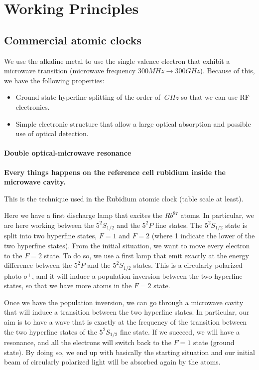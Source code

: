 \section{Working Principles}
\label{sec:working_principles}

\subsection{Commercial atomic clocks}
\label{sub:commercial_atomic_clocks}

We use the alkaline metal to use the single valence electron that exhibit a microwave transition (microwave frequency $300MHz \rightarrow 300GHz$).
Because of this, we have the following properties:

\begin{itemize}
    \item Ground state hyperfine splitting of the order of $~GHz$ so that we can use RF electronics.
    \item Simple electronic structure that allow a large optical absorption and possible use of optical detection.
\end{itemize}

\paragraph{Double optical-microwave resonance}

\textbf{Every things happens on the reference cell rubidium inside the microwave cavity.}

This is the technique used in the Rubidium atomic clock (table scale at least).

Here we have a first discharge lamp that excites the $Rb^{87}$ atoms.
In particular, we are here working between the $5^2S_{1/2}$ and the $5^2P$ fine states.
The $5^2S_{1/2}$ state is split into two hyperfine states, $F=1$ and $F=2$ (where 1 indicate the lower of the two hyperfine states).
From the initial situation, we want to move every electron to the $F=2$ state.
To do so, we use a first lamp that emit exactly at the energy difference between the $5^2P$ and the $5^2S_{1/2}$ states.
This is a circularly polarized photo $\sigma^+$, and it will induce a population inversion between the two hyperfine states, so that we have more atoms in the $F=2$ state.


Once we have the population inversion, we can go through a microwave cavity that will induce a transition between the two hyperfine states.
In particular, our aim is to have a wave that is exactly at the frequency of the transition between the two hyperfine states of the $5^2S_{1/2}$ fine state.
If we succeed, we will have a resonance, and all the electrons will switch back to the $F=1$ state (ground state).
By doing so, we end up with basically the starting situation and our initial beam of circularly polarized light will be absorbed again by the atoms.

